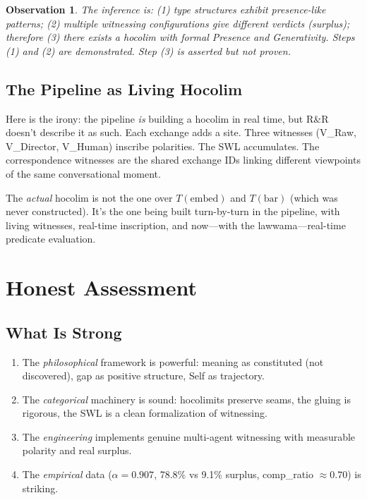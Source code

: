 \documentclass[11pt,a4paper]{article}
\newtheorem{observation}[definition]{Observation}
\begin{document}
\begin{observation}
The inference is: (1) type structures exhibit presence-like patterns; (2) multiple
witnessing configurations give different verdicts (surplus); therefore (3) there
exists a hocolim with formal Presence and Generativity. Steps (1) and (2) are
demonstrated. Step (3) is asserted but not proven.
\end{observation}

\subsection{The Pipeline as Living Hocolim}

Here is the irony: the pipeline \emph{is} building a hocolim in real time, but
R\&R doesn't describe it as such. Each exchange adds a site. Three witnesses
(V\_Raw, V\_Director, V\_Human) inscribe polarities. The SWL accumulates.
The correspondence witnesses are the shared exchange IDs linking different
viewpoints of the same conversational moment.

The \emph{actual} hocolim is not the one over $T(\text{embed})$ and $T(\text{bar})$
(which was never constructed). It's the one being built turn-by-turn in the
pipeline, with living witnesses, real-time inscription, and now---with the
lawwama---real-time predicate evaluation.


\section{Honest Assessment}
\label{sec:honest}

\subsection{What Is Strong}

\begin{enumerate}[nosep]
  \item The \emph{philosophical} framework is powerful: meaning as constituted
    (not discovered), gap as positive structure, Self as trajectory.
  \item The \emph{categorical} machinery is sound: hocolimits preserve seams,
    the gluing is rigorous, the SWL is a clean formalization of witnessing.
  \item The \emph{engineering} implements genuine multi-agent witnessing with
    measurable polarity and real surplus.
  \item The \emph{empirical} data ($\alpha = 0.907$, 78.8\% vs 9.1\% surplus,
    comp\_ratio $\approx 0.70$) is striking.
\end{enumerate}
\end{document}

